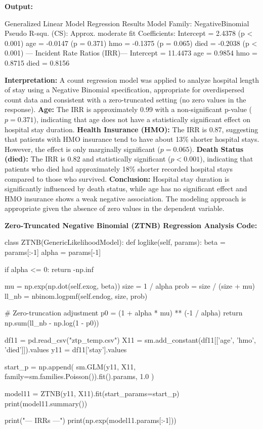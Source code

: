 \documentclass[12pt,a4paper]{article}
\begin{document}
\textbf{Output:}
\begin{codebox}
Generalized Linear Model Regression Results
Model Family: NegativeBinomial
Pseudo R-squ. (CS): Approx. moderate fit
Coefficients:
Intercept = 2.4378 (p < 0.001)
age = -0.0147 (p = 0.371)
hmo = -0.1375 (p = 0.065)
died = -0.2038 (p < 0.001)
--- Incident Rate Ratios (IRR)---
Intercept = 11.4473
age = 0.9854
hmo = 0.8715
died = 0.8156
\end{codebox}

\textbf{Interpretation:}
A count regression model was applied to analyze hospital length of stay using a Negative Binomial specification, appropriate for overdispersed count data and consistent with a zero-truncated setting (no zero values in the response).
\textbf{Age:} The IRR is approximately 0.99 with a non-significant p-value ($p = 0.371$), indicating that age does not have a statistically significant effect on hospital stay duration.
\textbf{Health Insurance (HMO):} The IRR is 0.87, suggesting that patients with HMO insurance tend to have about 13\% shorter hospital stays.
However, the effect is only marginally significant ($p = 0.065$).
\textbf{Death Status (died):} The IRR is 0.82 and statistically significant ($p < 0.001$), indicating that patients who died had approximately 18\% shorter recorded hospital stays compared to those who survived.
\textbf{Conclusion:} Hospital stay duration is significantly influenced by death status, while age has no significant effect and HMO insurance shows a weak negative association.
The modeling approach is appropriate given the absence of zero values in the dependent variable.


\textbf{Zero-Truncated Negative Binomial (ZTNB) Regression Analysis}
\textbf{Code:}
\begin{codebox}
class ZTNB(GenericLikelihoodModel):
    def loglike(self, params):
        beta = params[:-1]
        alpha = params[-1]
        
        if alpha <= 0:
            return -np.inf
            
        mu = np.exp(np.dot(self.exog, beta))
        size = 1 / alpha
        prob = size / (size + mu)
        ll_nb = nbinom.logpmf(self.endog, size, prob)
        
        # Zero-truncation adjustment
        p0 = (1 + alpha * mu) ** (-1 / alpha)
        return np.sum(ll_nb - np.log(1 - p0))

df11 = pd.read_csv("ztp_temp.csv")
X11 = sm.add_constant(df11[['age', 'hmo', 'died']]).values
y11 = df11['stay'].values

start_p = np.append(
    sm.GLM(y11, X11, family=sm.families.Poisson()).fit().params,
    1.0
)

model11 = ZTNB(y11, X11).fit(start_params=start_p)
print(model11.summary())

print("\n--- IRRs ---")
print(np.exp(model11.params[:-1]))
\end{codebox}
\end{document}
